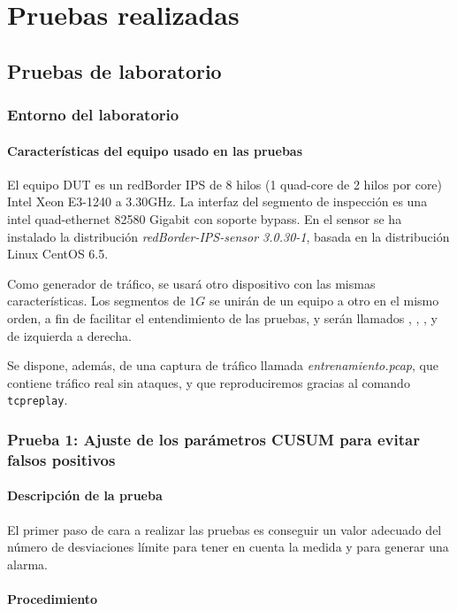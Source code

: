 \section{Pruebas realizadas}\label{sec:pruebas}
\subsection{Pruebas de laboratorio}
\subsubsection{Entorno del laboratorio}

\paragraph{Características del equipo usado en las pruebas}\mbox{}

El equipo \gls{DUT} es un redBorder IPS de 8 hilos (1 quad-core de 2 hilos por core) Intel Xeon E3-1240 a 3.30GHz. La 
interfaz del segmento de inspección es una intel quad-ethernet 82580 Gigabit con soporte bypass. En el sensor se ha 
instalado la distribución \emph{redBorder-IPS-sensor 3.0.30-1}, basada en la distribución Linux CentOS 6.5.

Como generador de tráfico, se usará otro dispositivo con las mismas características. Los segmentos de $1G$ se unirán de 
un equipo a otro en el mismo orden, a fin de facilitar el entendimiento de las pruebas, y serán llamados 
, , , y  de izquierda a derecha.

Se dispone, además, de una captura de tráfico llamada \emph{entrenamiento.pcap}, que contiene tráfico real sin ataques,
y que reproduciremos gracias al comando \texttt{tcpreplay}.

\subsubsection{Prueba 1: Ajuste de los parámetros CUSUM para evitar falsos positivos}
\paragraph{Descripción de la prueba}\mbox{}

El primer paso de cara a realizar las pruebas es conseguir un valor adecuado del número de desviaciones límite
para tener en cuenta la medida y para generar una alarma.

\paragraph{Procedimiento}\mbox{}

